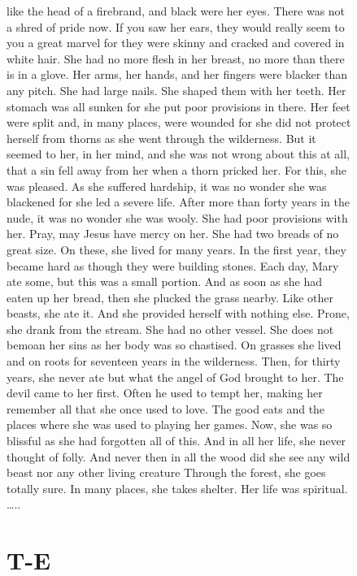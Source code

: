 \documentclass[
  letterpaper,
  DIV=11,
  numbers=noendperiod,
  oneside]{scrreprt}
\begin{document}
\begin{figure}
like the head of a firebrand, and black were her eyes. There was not a
shred of pride now. If you saw her ears, they would really seem to you a
great marvel for they were skinny and cracked and covered in white hair.
She had no more flesh in her breast, no more than there is in a glove.
Her arms, her hands, and her fingers were blacker than any pitch. She
had large nails. She shaped them with her teeth. Her stomach was all
sunken for she put poor provisions in there. Her feet were split and, in
many places, were wounded for she did not protect herself from thorns as
she went through the wilderness. But it seemed to her, in her mind, and
she was not wrong about this at all, that a sin fell away from her when
a thorn pricked her. For this, she was pleased. As she suffered
hardship, it was no wonder she was blackened for she led a severe life.
After more than forty years in the nude, it was no wonder she was wooly.
She had poor provisions with her. Pray, may Jesus have mercy on her. She
had two breads of no great size. On these, she lived for many years. In
the first year, they became hard as though they were building stones.
Each day, Mary ate some, but this was a small portion. And as soon as
she had eaten up her bread, then she plucked the grass nearby. Like
other beasts, she ate it. And she provided herself with nothing else.
Prone, she drank from the stream. She had no other vessel. She does not
bemoan her sins as her body was so chastised. On grasses she lived and
on roots for seventeen years in the wilderness. Then, for thirty years,
she never ate but what the angel of God brought to her. The devil came
to her first. Often he used to tempt her, making her remember all that
she once used to love. The good eats and the places where she was used
to playing her games. Now, she was so blissful as she had forgotten all
of this. And in all her life, she never thought of folly. And never then
in all the wood did she see any wild beast nor any other living creature
Through the forest, she goes totally sure. In many places, she takes
shelter. Her life was spiritual. \ldots..

\section{T-E}\label{t-e}


\end{figure}
\end{document}

